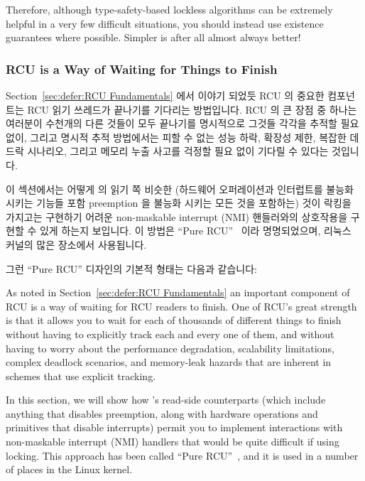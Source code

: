 Therefore, although type-safety-based lockless algorithms can be extremely
helpful in a very few difficult situations, you should instead use existence
guarantees where possible.
Simpler is after all almost always better!

\fi

\subsubsection{RCU is a Way of Waiting for Things to Finish}
\label{sec:defer:RCU is a Way of Waiting for Things to Finish}

Section~\ref{sec:defer:RCU Fundamentals} 에서 이야기 되었듯 RCU 의 중요한
컴포넌트는 RCU 읽기 쓰레드가 끝나기를 기다리는 방법입니다.
RCU 의 큰 장점 중 하나는 여러분이 수천개의 다른 것들이 모두 끝나기를 명시적으로
그것들 각각을 추적할 필요없이, 그리고 명시적 추적 방법에서는 피할 수 없는 성능
하락, 확장성 제한, 복잡한 데드락 시나리오, 그리고 메모리 누출 사고를 걱정할
필요 없이 기다릴 수 있다는 것입니다.

이 섹션에서는 어떻게  의 읽기 쪽 비슷한 (하드웨어
오퍼레이션과 인터럽트를 불능화 시키는 기능들 포함 preemption 을 불능화 시키는
모든 것을 포함하는) 것이 락킹을 가지고는 구현하기 어려운 non-maskable interrupt
(NMI) 핸들러와의 상호작용을 구현할 수 있게 하는지 보입니다.
이 방법은 ``Pure RCU''~\cite{PaulEdwardMcKenneyPhD} 이라 명명되었으며, 리눅스
커널의 많은 장소에서 사용됩니다.

그런 ``Pure RCU'' 디자인의 기본적 형태는 다음과 같습니다:

\iffalse

As noted in Section~\ref{sec:defer:RCU Fundamentals}
an important component
of RCU is a way of waiting for RCU readers to finish.
One of
RCU's great strength is that it allows you to wait for each of
thousands of different things to finish without having to explicitly
track each and every one of them, and without having to worry about
the performance degradation, scalability limitations, complex deadlock
scenarios, and memory-leak hazards that are inherent in schemes that
use explicit tracking.

In this section, we will show how 's
read-side counterparts (which include anything that disables preemption,
along with hardware operations and
primitives that disable interrupts) permit you to implement interactions with
non-maskable interrupt
(NMI) handlers that would be quite difficult if using locking.
This approach has been called ``Pure RCU''~\cite{PaulEdwardMcKenneyPhD},
and it is used in a number of places in the Linux kernel.

